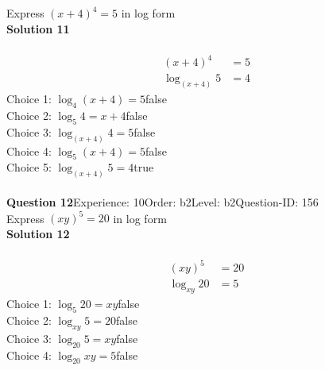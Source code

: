 \documentclass{article}
\begin{document}
Express $(x+4)^4=5$ in log form\\[4pt]
\noindent\textbf{Solution 11}\\[2pt]
\\[-35pt]\begin{align*}
(x+4)^4&=5\\[2pt]
\log_{(x+4)}5&=4
\end{align*}
Choice 1: \hspace{20pt}$\log_{4}(x+4)=5$\hspace{20pt}false\\
Choice 2: \hspace{20pt}$\log_{5}4=x+4$\hspace{20pt}false\\
Choice 3: \hspace{20pt}$\log_{(x+4)}4=5$\hspace{20pt}false\\
Choice 4: \hspace{20pt}$\log_{5}(x+4)=5$\hspace{20pt}false\\
Choice 5: \hspace{20pt}$\log_{(x+4)}5=4$\hspace{20pt}true\\
\\[4pt]
\noindent\textbf{Question 12}\hspace{20pt}Experience: 10\hspace{20pt}Order: b2\hspace{20pt}Level: b2\hspace{20pt}Question-ID: 156\\[2pt]
Express $(xy)^5=20$ in log form\\[4pt]
\noindent\textbf{Solution 12}\\[2pt]
\\[-35pt]\begin{align*}
(xy)^5&=20\\[2pt]
\log_{xy}20&=5
\end{align*}
Choice 1: \hspace{20pt}$\log_{5}20=xy$\hspace{20pt}false\\
Choice 2: \hspace{20pt}$\log_{xy}5=20$\hspace{20pt}false\\
Choice 3: \hspace{20pt}$\log_{20}5=xy$\hspace{20pt}false\\
Choice 4: \hspace{20pt}$\log_{20}xy=5$\hspace{20pt}false\\
\end{document}
